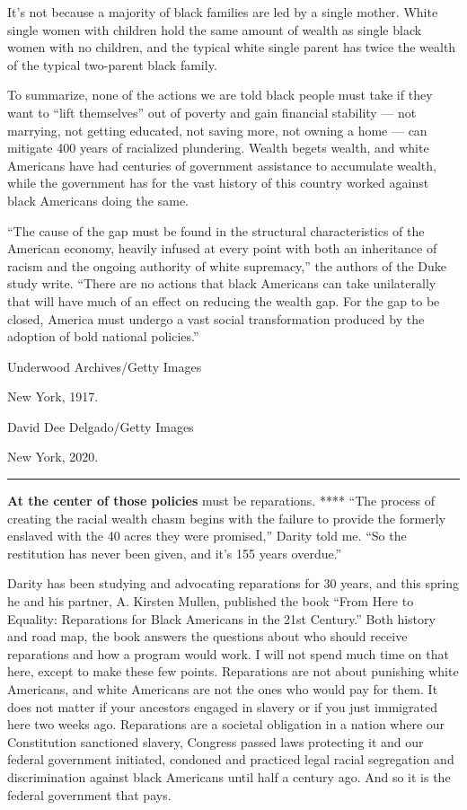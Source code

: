 It's not because a majority of black families are led by a single
mother. White single women with children hold the same amount of wealth
as single black women with no children, and the typical white single
parent has twice the wealth of the typical two-parent black family.

To summarize, none of the actions we are told black people must take if
they want to ``lift themselves'' out of poverty and gain financial
stability --- not marrying, not getting educated, not saving more, not
owning a home --- can mitigate 400 years of racialized plundering.
Wealth begets wealth, and white Americans have had centuries of
government assistance to accumulate wealth, while the government has for
the vast history of this country worked against black Americans doing
the same.

``The cause of the gap must be found in the structural characteristics
of the American economy, heavily infused at every point with both an
inheritance of racism and the ongoing authority of white supremacy,''
the authors of the Duke study write. ``There are no actions that black
Americans can take unilaterally that will have much of an effect on
reducing the wealth gap. For the gap to be closed, America must undergo
a vast social transformation produced by the adoption of bold national
policies.''

Underwood Archives/Getty Images

New York, 1917.

David Dee Delgado/Getty Images

New York, 2020.

\begin{center}\rule{0.5\linewidth}{\linethickness}\end{center}

\textbf{At the center of those policies} must be reparations. **** ``The
process of creating the racial wealth chasm begins with the failure to
provide the formerly enslaved with the 40 acres they were promised,''
Darity told me. ``So the restitution has never been given, and it's 155
years overdue.''

Darity has been studying and advocating reparations for 30 years, and
this spring he and his partner, A. Kirsten Mullen, published the book
``From Here to Equality: Reparations for Black Americans in the 21st
Century.'' Both history and road map, the book answers the questions
about who should receive reparations and how a program would work. I
will not spend much time on that here, except to make these few points.
Reparations are not about punishing white Americans, and white Americans
are not the ones who would pay for them. It does not matter if your
ancestors engaged in slavery or if you just immigrated here two weeks
ago. Reparations are a societal obligation in a nation where our
Constitution sanctioned slavery, Congress passed laws protecting it and
our federal government initiated, condoned and practiced legal racial
segregation and discrimination against black Americans until half a
century ago. And so it is the federal government that pays.

